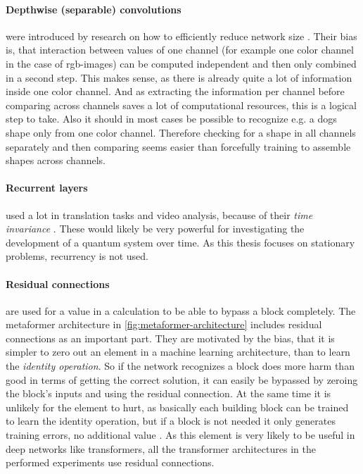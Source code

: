 \paragraph{Depthwise (separable) convolutions} were introduced by research on how to efficiently reduce network size \cite{mobileNetPaper}.
Their bias is, that interaction between values of one channel (for example one color channel in the case of rgb-images) can be computed independent and then only combined in a second step.
This makes sense, as there is already quite a lot of information inside one color channel. 
And as extracting the information per channel before comparing across channels saves a lot of computational resources, this is a logical step to take.
Also it should in most cases be possible to recognize e.g. a dogs shape only from one color channel. 
Therefore checking for a shape in all channels separately and then comparing seems easier than forcefully training to assemble shapes across channels.

\paragraph{Recurrent layers} used a lot in translation tasks and video analysis, because of their \emph{time invariance} \cite{relationalInductiveBiasesAndGraphNetworks}. 
These would likely be very powerful for investigating the development of a quantum system over time. 
As this thesis focuses on stationary problems, recurrency is not used.

\paragraph{Residual connections} are used for a value in a calculation to be able to bypass a block completely.
The metaformer architecture in \autoref{fig:metaformer-architecture} includes residual connections as an important part.
They are motivated by the bias, that it is simpler to zero out an element in a machine learning architecture, than to learn the \emph{identity operation}. 
So if the network recognizes a block does more harm than good in terms of getting the correct solution, it can easily be bypassed by zeroing the block's inputs and using the residual connection. 
At the same time it is unlikely for the element to hurt, as basically each building block can be trained to learn the identity operation, but if a block is not needed it only generates training errors, no additional value \cite{deepResidualLearningForImageRecognition}.
As this element is very likely to be useful in deep networks like transformers, all the transformer architectures in the performed experiments use residual connections.

